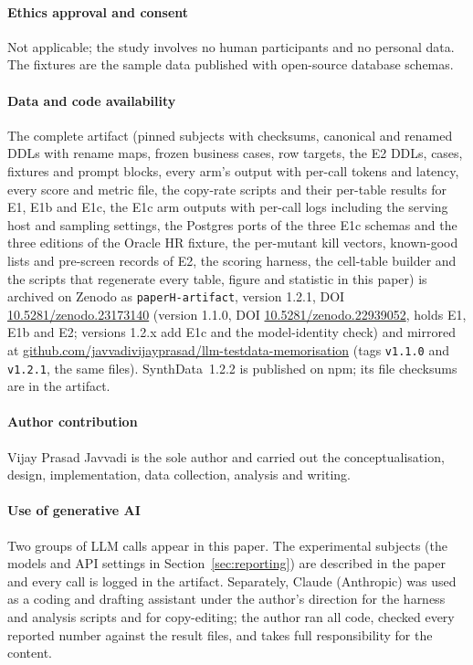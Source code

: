 \documentclass[preprint,12pt]{elsarticle}
\begin{document}
\paragraph{Ethics approval and consent} Not applicable; the study involves no human participants and no personal data. The fixtures are the sample data published with open-source database schemas.

\paragraph{Data and code availability}
\label{sec:data}
The complete artifact (pinned subjects with checksums, canonical and renamed DDLs with rename maps, frozen business cases, row targets, the E2 DDLs, cases, fixtures and prompt blocks, every arm's output with per-call tokens and latency, every score and metric file, the copy-rate scripts and their per-table results for E1, E1b and E1c, the E1c arm outputs with per-call logs including the serving host and sampling settings, the Postgres ports of the three E1c schemas and the three editions of the Oracle HR fixture, the per-mutant kill vectors, known-good lists and pre-screen records of E2, the scoring harness, the cell-table builder and the scripts that regenerate every table, figure and statistic in this paper) is archived on Zenodo as \texttt{paperH-artifact}, version 1.2.1, DOI \href{https://doi.org/10.5281/zenodo.23173140}{10.5281/zenodo.23173140} (version 1.1.0, DOI \href{https://doi.org/10.5281/zenodo.22939052}{10.5281/zenodo.22939052}, holds E1, E1b and E2; versions 1.2.x add E1c and the model-identity check) and mirrored at \href{https://github.com/javvadivijayprasad/llm-testdata-memorisation}{github.com/javvadivijayprasad/llm-testdata-memorisation} (tags \texttt{v1.1.0} and \texttt{v1.2.1}, the same files). SynthData~1.2.2 is published on npm; its file checksums are in the artifact.

\paragraph{Author contribution} Vijay Prasad Javvadi is the sole author and carried out the conceptualisation, design, implementation, data collection, analysis and writing.

\paragraph{Use of generative AI} Two groups of LLM calls appear in this paper. The experimental subjects (the models and API settings in Section~\ref{sec:reporting}) are described in the paper and every call is logged in the artifact. Separately, Claude (Anthropic) was used as a coding and drafting assistant under the author's direction for the harness and analysis scripts and for copy-editing; the author ran all code, checked every reported number against the result files, and takes full responsibility for the content.
\end{document}
